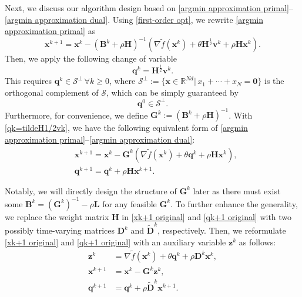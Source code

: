 \documentclass[12pt,draftcls,onecolumn]{IEEEtran}
\renewcommand{\Re}{{\mathbb{R}}}
\newcommand{\bx}{{\mathbf{x}}}
\newcommand{\bB}{{\mathbf{B}}}
\newcommand{\bG}{{\mathbf{G}}}
\newcommand{\bL}{{\mathbf{L}}}
\newcommand{\bH}{{\mathbf{H}}}
\newcommand{\bD}{{\mathbf{D}}}
\begin{document}
Next, we discuss our algorithm design based on \eqref{argmin approximation primal}--\eqref{argmin approximation dual}. Using \eqref{first-order opt}, we rewrite \eqref{argmin approximation primal} as
\begin{equation}
	\mathbf{x}^{k+1} = \mathbf{x}^k - (\mathbf{B}^k + \rho \mathbf{H})^{-1}(\nabla \tilde{f}(\mathbf{x}^k) + \theta\bH^{\frac{1}{2}} \mathbf{v}^k + \rho \mathbf{H} \mathbf{x}^k). \label{x^k+1 vk}
\end{equation}
Then, we apply the following change of variable
\begin{equation}\label{qk=tildeH1/2vk}
\mathbf{q}^k = \bH^{\frac{1}{2}} \mathbf{v}^k. 
\end{equation}
This requires $\mathbf{q}^k \in \mathcal{S}^{\perp}\, \forall k \geq 0$, where $\mathcal{S}^{\perp} := \{\mathbf{x}\in \Re ^{Nd}| \, x_1 + \cdots + x_N = \mathbf{0}\}$ is the orthogonal complement of $\mathcal{S}$, which can be simply guaranteed by
\begin{equation}
\mathbf{q}^0 \in \mathcal{S}^{\perp}.\label{q0}
\end{equation}
Furthermore, for convenience, we define $\mathbf{G}^k:= (\mathbf{B}^k + \rho \mathbf{H})^{-1}$. With \eqref{qk=tildeH1/2vk}, we have the following equivalent form of \eqref{argmin approximation primal}--\eqref{argmin approximation dual}:
\begin{align} 
\label{xk+1 original} &\mathbf{x}^{k+1} = \mathbf{x}^k - \mathbf{G}^k (\nabla \tilde{f}(\mathbf{x}^k) + \theta\mathbf{q}^k + \rho \mathbf{H} \mathbf{x}^k),\\ 
\label{qk+1 original} &\mathbf{q}^{k+1}=\mathbf{q}^{k}+\rho \bH \mathbf{x}^{k+1}.
\end{align}

Notably, we will directly design the structure of $\bG^k$ later as there must exist some $\bB^k=(\bG^{k})^{-1}-\rho\bL$ for any feasible $\bG^k$. To further enhance the generality, we replace the weight matrix $\mathbf{H}$ in \eqref{xk+1 original} and \eqref{qk+1 original} with two possibly time-varying matrices $\mathbf{D}^k$ and $\tilde{\bD}^k$, respectively. Then, we reformulate \eqref{xk+1 original} and \eqref{qk+1 original} with an auxiliary variable $\mathbf{z}^{k}$ as follows: 
\begin{align}
    \label{zk final} \mathbf{z}^{k} &= \nabla \tilde{f}(\mathbf{x}^k) + \theta\mathbf{q}^k + \rho \mathbf{D}^k \mathbf{x}^k,\\
	\label{xk+1 final} \mathbf{x}^{k+1} &= \mathbf{x}^k - \mathbf{G}^k \mathbf{z}^k,\\ 
	\label{qk+1 final} \mathbf{q}^{k+1} &= \mathbf{q}^{k}+\rho \tilde{\mathbf{D}}^k\bx^{k+1}.
\end{align}
\end{document}
